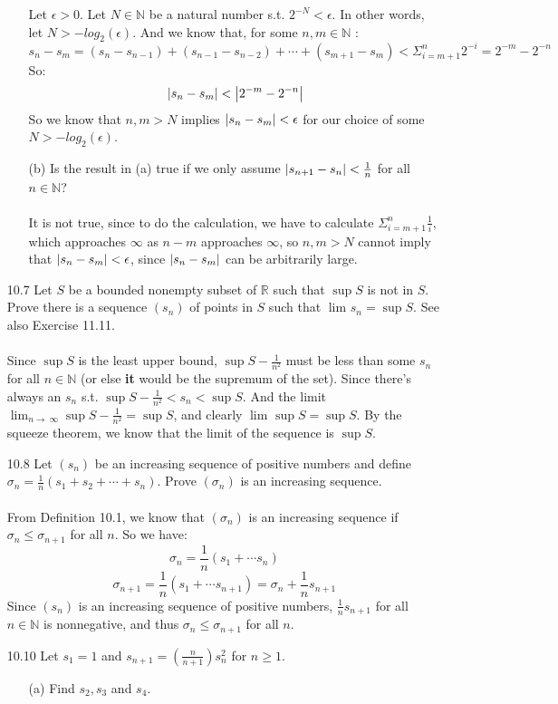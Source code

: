\begin{itemize}
\begin{itemize}
        Let $\epsilon > 0$. Let $N \in \mathds{N}$ be a natural number s.t. $2^{-N} < \epsilon$. In other words, let $N > -log_2(\epsilon)$. And we know that, for some $n,m \in \mathds{N}$ :
        $$s_n - s_m = (s_n - s_{n-1}) + (s_{n-1} - s_{n-2}) + \cdots + (s_{m+1} - s_m) < \Sigma_{i=m+1}^{n} 2^{-i} = 2^{-m} - 2^{-n}$$
        So:
        $$\left\vert s_n - s_m \right\vert < \left\vert 2^{-m} - 2^{-n} \right\vert$$
        So we know that $n,m > N$ implies $\left\vert s_n - s_m \right\vert < \epsilon$ for our choice of some $N > -log_2(\epsilon)$.
      \item [(b)] Is the result in (a) true if we only assume $\left\vert s_{n+1} - s_n \right\vert < \frac{1}{n}$ for all $n \in \mathds{N}$?\\\\

        It is not true, since to do the calculation, we have to calculate $\Sigma_{i = m+1}^n \frac{1}{i}$, which approaches $\infty$ as $n-m$ approaches $\infty$, so $n,m > N$ cannot imply that $\left\vert s_n - s_m \right\vert < \epsilon$, since $\left\vert s_n - s_m \right\vert$ can be arbitrarily large.\\

    \end{itemize}
  \item [10.7]
    Let $S$ be a bounded nonempty subset of $\mathds{R}$ such that $\sup S$ is not in $S$. Prove there is a sequence $(s_n)$ of points in $S$ such that $\lim_{} s_n = \sup S$. See also Exercise 11.11.\\\\

    Since $\sup S$ is the least upper bound, $\sup S - \frac{1}{n^2}$ must be less than some $s_n$ for all $n \in \mathds{N}$ (or else \textbf{it} would be the supremum of the set). Since there's always an $s_n$ s.t. $\sup S - \frac{1}{n^2} < s_n < \sup S$. And the limit $\lim_{n \to\ \infty} \sup S - \frac{1}{n^2} = \sup S$, and clearly $\lim_{} \sup S = \sup S$. By the squeeze theorem, we know that the limit of the sequence is $\sup S$.
  \item [10.8]
    Let $(s_n)$ be an increasing sequence of positive numbers and define $\sigma_n = \frac{1}{n}(s_1 + s_2 + \cdots + s_n)$. Prove $(\sigma_n)$ is an increasing sequence.\\\\

    From Definition 10.1, we know that $(\sigma_n)$ is an increasing sequence if $\sigma_n \leq \sigma_{n+1}$ for all $n$.
    So we have:
    $$\sigma_n = \frac{1}{n}(s_1 + \cdots s_n)$$
    $$\sigma_{n+1} = \frac{1}{n}(s_1 + \cdots s_{n+1}) = \sigma_n + \frac{1}{n} s_{n+1}$$
    Since $(s_n)$ is an increasing sequence of positive numbers, $\frac{1}{n} s_{n+1}$ for all $n \in \mathds{N}$ is nonnegative, and thus $\sigma_n \leq \sigma_{n+1}$ for all $n$.
  \item [10.10]
    Let $s_1 = 1$ and $s_{n+1} = (\frac{n}{n+1})s_n^2$ for $n \geq 1$.
    \begin{itemize}
      \item [(a)] Find $s_2, s_3$ and $s_4$.\\


\end{itemize}
\end{itemize}
